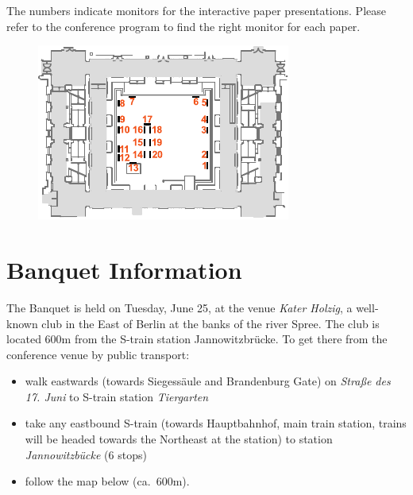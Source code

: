 The numbers indicate monitors for the interactive paper presentations. Please refer to the conference program to find the right monitor for each paper.
\begin{figure}[h!]
\center
\includegraphics[height=0.4\textheight]{local_img/maps/interactive_session}
\end{figure}



 \section{Banquet Information}
The Banquet is held on Tuesday, June 25, at the venue \emph{Kater Holzig}, a well-known club in the East of Berlin at the banks of the river Spree. The club is located 600m from the S-train station Jannowitzbr\"ucke. To get there from the conference venue by public transport:
\begin{itemize}
 \item walk eastwards (towards Siegess\"aule and Brandenburg Gate) on \emph{Stra{\ss}e des 17. Juni} to S-train station  \emph{Tiergarten}
 \item take any eastbound S-train (towards Hauptbahnhof, main train station, trains will be headed towards the Northeast at the station) to station \emph{Jannowitzb\"ucke} (6 stops)
 \item follow the map below (ca.~600m). 
\end{itemize}

\label{sec:banquetinfo}
\begin{figure}[h!]
\center
{}
\end{figure}

